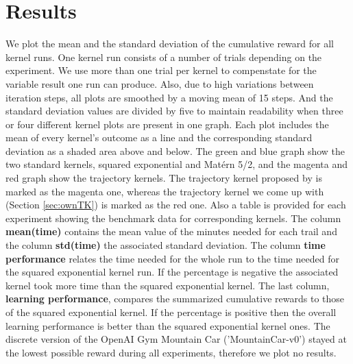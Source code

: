 \chapter{Results}
\label{chap:5}
%
We plot the mean and the standard deviation of the cumulative reward for all kernel runs. One kernel run consists of a number of trials depending on the experiment. We use more than one trial per kernel to compenstate for the variable result one run can produce. Also, due to high variations between iteration steps, all plots are smoothed by a moving mean of 15 steps. And the standard deviation values are divided by five to maintain readability when three or four different kernel plots are present in one graph. Each plot includes the mean of every kernel's outcome as a line and the corresponding standard deviation as a shaded area above and below. The green and blue graph show the two standard kernels, squared exponential and Matérn 5/2, and the magenta and red graph show the trajectory kernels. The trajectory kernel proposed by \cite{wilson2014using} is marked as the magenta one, whereas the trajectory kernel we come up with (Section \ref{sec:ownTK}) is marked as the red one. Also a table is provided for each experiment showing the benchmark data for corresponding kernels. The column \textbf{mean(time)} contains the mean value of the minutes needed for each trail and the column \textbf{std(time)} the associated standard deviation. The column \textbf{time performance} relates the time needed for the whole run to the time needed for the squared exponential kernel run. If the percentage is negative the associated kernel took more time than the squared exponential kernel. The last column, \textbf{learning performance}, compares the summarized cumulative rewards to those of the squared exponential kernel. If the percentage is positive then the overall learning performance is better than the squared exponential kernel ones. The discrete version of the OpenAI Gym Mountain Car ('MountainCar-v0') stayed at the lowest possible reward during all experiments, therefore we plot no results.

